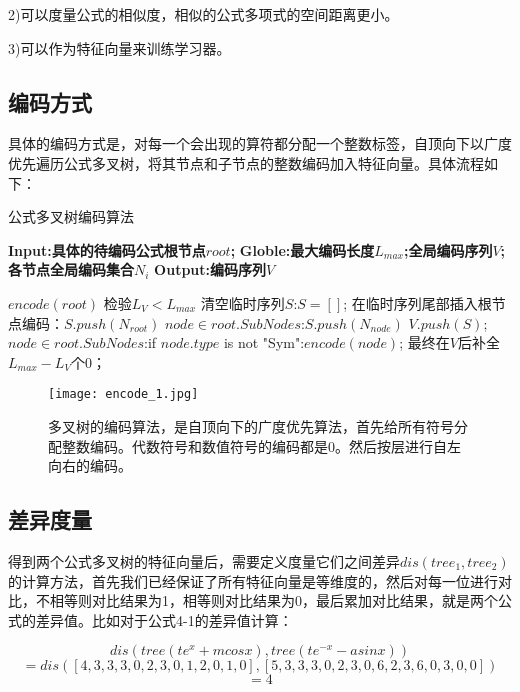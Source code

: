 \documentclass[runningheads]{llncs}
\begin{document}
2)可以度量公式的相似度，相似的公式多项式的空间距离更小。

3)可以作为特征向量来训练学习器。

\subsection{编码方式}
具体的编码方式是，对每一个会出现的算符都分配一个整数标签，自顶向下以广度优先遍历公式多叉树，将其节点和子节点的整数编码加入特征向量。具体流程如下：


\begin{algorithm}[t]
\caption{公式多叉树编码算法} %
\hspace*{0.02in} {\bf Input:具体的待编码公式根节点$root$; } 
\hspace*{0.02in} {\bf Globle:最大编码长度$L_{max}$;全局编码序列$V$;各节点全局编码集合${N_i}$ }
\hspace*{0.02in} {\bf Output:编码序列$V$} 
\begin{algorithmic}[1]
\State $encode(root)$
\State 检验$L_V<L_{max}$
\State 清空临时序列$S$:$S=[]$;
\State 在临时序列尾部插入根节点编码：$S.push(N_{root})$
\State \For $node \in root.SubNodes$:$S.push(N_{node})$\EndFor
\State $V.push(S)$;
\State \For $node \in root.SubNodes$:if $node.type$ is not "Sym":$encode(node)$;\EndFor
\State 最终在$V$后补全$L_{max}-L_{V}$个0；
\end{algorithmic}
\end{algorithm}


\begin{figure}[H]
\centering
\texttt{[image: encode\_1.jpg]}
\caption{多叉树的编码算法，是自顶向下的广度优先算法，首先给所有符号分配整数编码。代数符号和数值符号的编码都是0。然后按层进行自左向右的编码。}
\end{figure}


\subsection{差异度量}
得到两个公式多叉树的特征向量后，需要定义度量它们之间差异$dis(tree_1,tree_2)$的计算方法，首先我们已经保证了所有特征向量是等维度的，然后对每一位进行对比，不相等则对比结果为1，相等则对比结果为0，最后累加对比结果，就是两个公式的差异值。比如对于公式4-1的差异值计算：

$$dis(tree(te^x+mcosx),tree(te^{-x}-asinx))$$
$$=dis([4,3,3,3,0,2,3,0,1,2,0,1,0],[5,3,3,3,0,2,3,0,6,2,3,6,0,3,0,0])$$
$$=4$$
\end{document}

